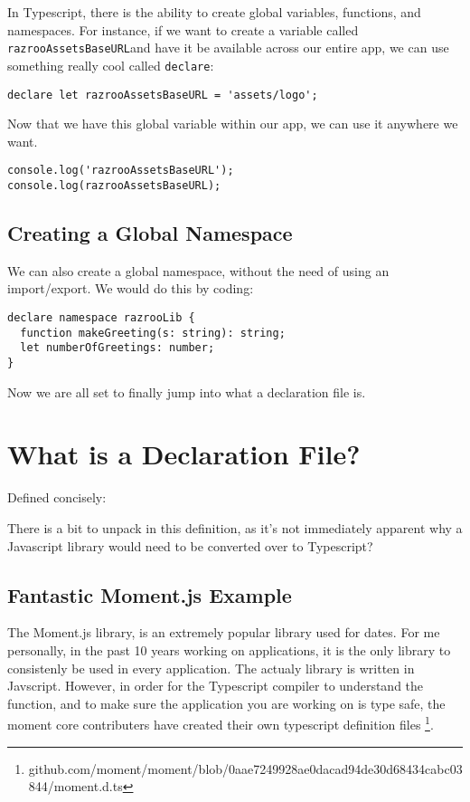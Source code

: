 In Typescript, there is the ability to create global variables, functions, and namespaces. For instance, if we want to create a variable called \lstinline{razrooAssetsBaseURL}and have it be available across our entire app, we can use something really cool called \lstinline{declare}:

\begin{verbatim}
declare let razrooAssetsBaseURL = 'assets/logo';  
\end{verbatim}

Now that we have this global variable within our app, we can use it anywhere we want.

\begin{lstlisting}[caption=useless.component.ts]
console.log('razrooAssetsBaseURL');
console.log(razrooAssetsBaseURL);
\end{lstlisting}

\subsection{Creating a Global Namespace}
We can also create a global namespace, without the need of using an import/export. We would do this by coding:

\begin{verbatim}
declare namespace razrooLib {
  function makeGreeting(s: string): string;
  let numberOfGreetings: number;
}
\end{verbatim}

Now we are all set to finally jump into what a declaration file is.

\section{What is a Declaration File?}
Defined concisely: 
\begin{quote}
\end{quote}

There is a bit to unpack in this definition, as it's not immediately apparent why a Javascript library would need to be converted over to Typescript? 

\subsection{Fantastic Moment.js Example }
The Moment.js library, is an extremely popular library used for dates. For me personally, in the past 10 years working on applications, it is the only library to consistenly be used in every application. The actualy library is written in Javscript. However, in order for the Typescript compiler to understand the function, and to make sure the application you are working on is type safe, the moment core contributers have created their own typescript definition files \footnote{github.com/moment/moment/blob/0aae7249928ae0dacad94de30d68434cabc03844/moment.d.ts}.  

